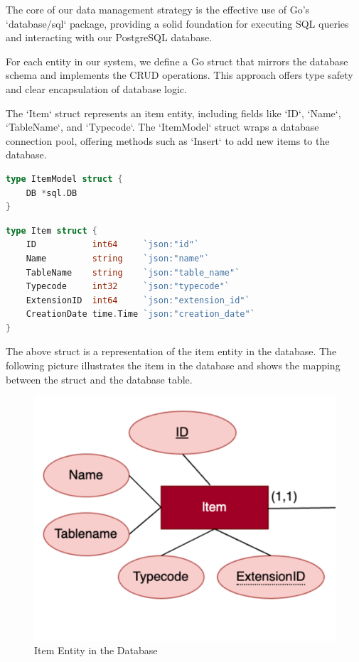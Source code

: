The core of our data management strategy is the effective use of Go's `database/sql` package, providing a solid foundation for executing SQL queries and interacting with our PostgreSQL database.

For each entity in our system, we define a Go struct that mirrors the database schema and implements the CRUD operations.
This approach offers type safety and clear encapsulation of database logic.

The `Item` struct represents an item entity, including fields like `ID`, `Name`, `TableName`, and `Typecode`.
The `ItemModel` struct wraps a database connection pool, offering methods such as `Insert` to add new items to the database.

\begin{lstlisting}[language=Go,label={lst:lstlisting17}]
type ItemModel struct {
	DB *sql.DB
}
\end{lstlisting}

\begin{lstlisting}[language=Go,label={lst:lstlisting2}]
type Item struct {
    ID           int64     `json:"id"`
    Name         string    `json:"name"`
    TableName    string    `json:"table_name"`
    Typecode     int32     `json:"typecode"`
    ExtensionID  int64     `json:"extension_id"`
    CreationDate time.Time `json:"creation_date"`
}
\end{lstlisting}

The above struct is a representation of the item entity in the database.
The following picture illustrates the item in the database and shows the mapping between the struct and the database table.

\begin{figure}[ht]
    \centering
    \includegraphics[scale=0.4]{./images/database/item_er}
    \caption{Item Entity in the Database}
    \label{fig:item_database_model}
\end{figure}

